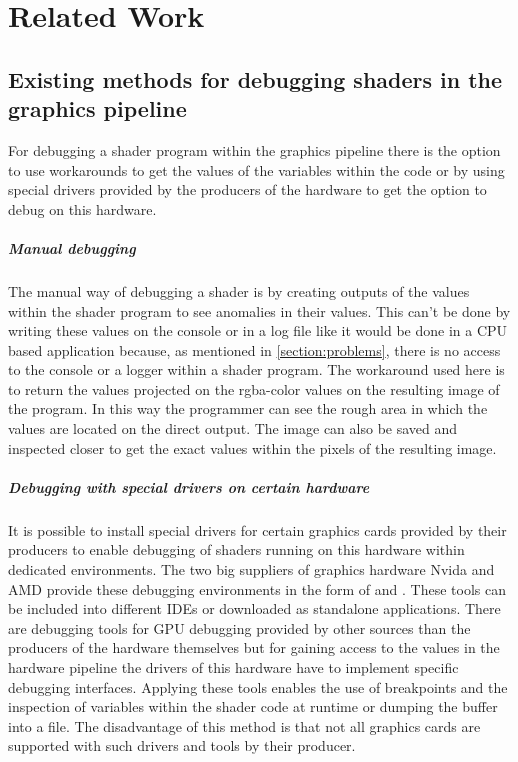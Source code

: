 
\chapter{Related Work}\label{cha:RelatedWork}
\section{Existing methods for debugging shaders in the graphics pipeline}
\label{section:debuggingMethods}

For debugging a shader program within the graphics pipeline there is the option to use workarounds to get the values of the variables within the code or by using special drivers provided by the producers of the hardware to get the option to debug on this hardware.

\paragraph{Manual debugging}

The manual way of debugging a shader is by creating outputs of the values within the shader program to see anomalies in their values. This can't be done by writing these values on the console or in a log file like it would be done in a CPU based application because, as mentioned in \autoref{section:problems}, there is no access to the console or a logger within a shader program. The workaround used here is to return the values projected on the rgba-color values on the resulting image of the program. In this way the programmer can see the rough area in which the values are located on the direct output. The image can also be saved and inspected closer to get the exact values within the pixels of the resulting image.

\paragraph{Debugging with special drivers on certain hardware}
\label{section:debuggingMethods_drivers}

It is possible to install special drivers for certain graphics cards provided by their producers to enable debugging of shaders running on this hardware within dedicated environments. The two big suppliers of graphics hardware Nvida and AMD provide these debugging environments in the form of \cite{Nvidia_Nsight} and \cite{AMD_GPUPerfStudio}. These tools can be included into different IDEs or downloaded as standalone applications. There are debugging tools for GPU debugging provided by other sources than the producers of the hardware themselves but for gaining access to the values in the hardware pipeline the drivers of this hardware have to implement specific debugging interfaces. Applying these tools enables the use of breakpoints and the inspection of variables within the shader code at runtime or dumping the buffer into a file. The disadvantage of this method is that not all graphics cards are supported with such drivers and tools by their producer.

